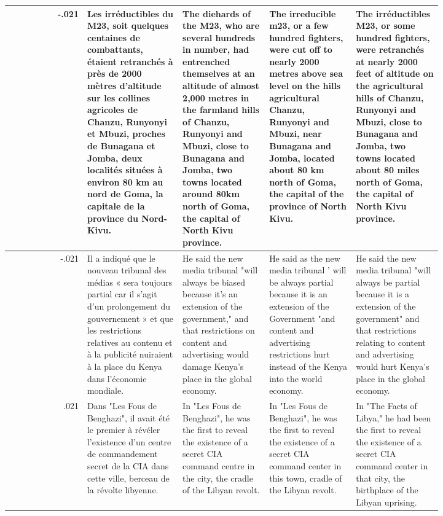 \begin{table}[ht]
\begin{tabular}{r @{\hspace{2mm}} p{0.22\linewidth}p{0.20\linewidth}p{0.20\linewidth}p{0.20\linewidth}}
-.021 & Les irréductibles du M23, soit quelques centaines de combattants, étaient retranchés à près de 2000 mètres d'altitude sur les collines agricoles de Chanzu, Runyonyi et Mbuzi, proches de Bunagana et Jomba, deux localités situées à environ 80 km au nord de Goma, la capitale de la province du Nord-Kivu. & The diehards of the M23, who are several hundreds in number, had entrenched themselves at an altitude of almost 2,000 metres in the farmland hills of Chanzu, Runyonyi and Mbuzi, close to Bunagana and Jomba, two towns located around 80km north of Goma, the capital of North Kivu province. & The irreducible m23, or a few hundred fighters, were cut off to nearly 2000 metres above sea level on the hills agricultural Chanzu, Runyonyi and Mbuzi, near Bunagana and Jomba, located about 80 km north of Goma, the capital of the province of North Kivu. & The irréductibles M23, or some hundred fighters, were retranchés at nearly 2000 feet of altitude on the agricultural hills of Chanzu, Runyonyi and Mbuzi, close to Bunagana and Jomba, two towns located about 80 miles north of Goma, the capital of North Kivu province. \\\hline
-.021 & Il a indiqué que le nouveau tribunal des médias « sera toujours partial car il s'agit d'un prolongement du gouvernement » et que les restrictions relatives au contenu et à la publicité nuiraient à la place du Kenya dans l'économie mondiale. & He said the new media tribunal "will always be biased because it's an extension of the government," and that restrictions on content and advertising would damage Kenya's place in the global economy. & He said as the new media tribunal ' will be always partial because it is an extension of the Government "and content and advertising restrictions hurt instead of the Kenya into the world economy. & He said the new media tribunal "will always be partial because it is a extension of the government" and that restrictions relating to content and advertising would hurt Kenya's place in the global economy. \\\hline
.021 & Dans "Les Fous de Benghazi", il avait été le premier à révéler l'existence d'un centre de commandement secret de la CIA dans cette ville, berceau de la révolte libyenne. & In "Les Fous de Benghazi", he was the first to reveal the existence of a secret CIA command centre in the city, the cradle of the Libyan revolt. & In "Les Fous de Benghazi", he was the first to reveal the existence of a secret CIA command center in this town, cradle of the Libyan revolt. & In "The Facts of Libya," he had been the first to reveal the existence of a secret CIA command center in that city, the birthplace of the Libyan uprising. \\\hline

\end{tabular}
\end{table}
